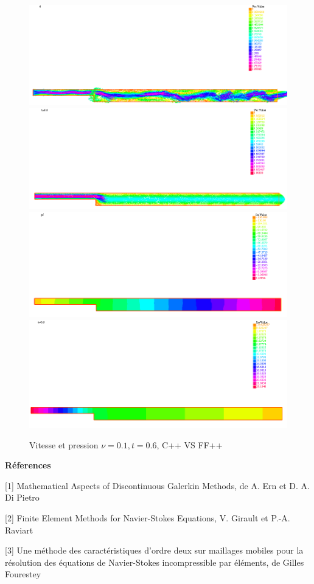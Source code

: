 \documentclass[a4paper,12pt]{article}
\begin{document}
\begin{figure}[!t]
	\caption{Vitesse et pression $\nu = 0.1,t=0.6$, C++ VS FF++}
	\centering
	\includegraphics[width=0.49\linewidth]{image/c++_NS_nu=01_t=6_u.png}
	\includegraphics[width=0.49\linewidth]{image/ff++_NS_nu=01_t=6_u.png}
	\includegraphics[width=0.49\linewidth]{image/c++_NS_nu=01_t=6_p.png}
	\includegraphics[width=0.49\linewidth]{image/ff++_NS_nu=01_t=6_p.png}
\end{figure}

\newpage

\textbf{Réferences}

[1] Mathematical Aspects of Discontinuous Galerkin Methods, de A. Ern et D. A. Di Pietro

[2] Finite Element Methods for Navier-Stokes Equations, V. Girault
et P.-A. Raviart

[3] Une méthode des caractéristiques d’ordre deux sur maillages mobiles pour la résolution des équations de Navier-Stokes incompressible par éléments, de Gilles Fourestey
\end{document}
